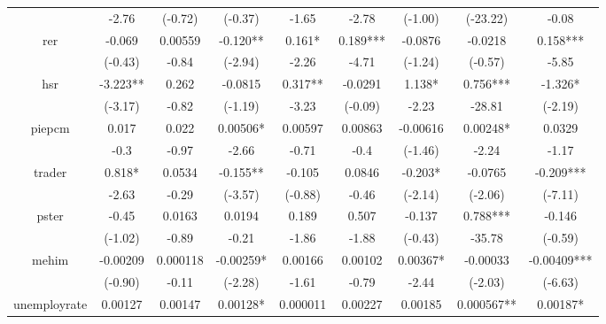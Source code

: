\begin{table}
{\begin{tabular}{ccccccccc}
                                        & -2.76     & (-0.72)     & (-0.37)    & -1.65       & -2.78      & (-1.00)        & (-23.22)   & -0.08       \\
            rer                         & -0.069    & 0.00559     & -0.120**   & 0.161*      & 0.189***   & -0.0876        & -0.0218    & 0.158***    \\
                                        & (-0.43)   & -0.84       & (-2.94)    & -2.26       & -4.71      & (-1.24)        & (-0.57)    & -5.85       \\
            hsr                         & -3.223**  & 0.262       & -0.0815    & 0.317**     & -0.0291    & 1.138*         & 0.756***   & -1.326*     \\
                                        & (-3.17)   & -0.82       & (-1.19)    & -3.23       & (-0.09)    & -2.23          & -28.81     & (-2.19)     \\
            piepcm                      & 0.017     & 0.022       & 0.00506*   & 0.00597     & 0.00863    & -0.00616       & 0.00248*   & 0.0329      \\
                                        & -0.3      & -0.97       & -2.66      & -0.71       & -0.4       & (-1.46)        & -2.24      & -1.17       \\
            trader                      & 0.818*    & 0.0534      & -0.155**   & -0.105      & 0.0846     & -0.203*        & -0.0765    & -0.209***   \\
                                        & -2.63     & -0.29       & (-3.57)    & (-0.88)     & -0.46      & (-2.14)        & (-2.06)    & (-7.11)     \\
            pster                       & -0.45     & 0.0163      & 0.0194     & 0.189       & 0.507      & -0.137         & 0.788***   & -0.146      \\
                                        & (-1.02)   & -0.89       & -0.21      & -1.86       & -1.88      & (-0.43)        & -35.78     & (-0.59)     \\
            mehim                       & -0.00209  & 0.000118    & -0.00259*  & 0.00166     & 0.00102    & 0.00367*       & -0.00033   & -0.00409*** \\
                                        & (-0.90)   & -0.11       & (-2.28)    & -1.61       & -0.79      & -2.44          & (-2.03)    & (-6.63)     \\
            unemployrate                & 0.00127   & 0.00147     & 0.00128*   & 0.000011    & 0.00227    & 0.00185        & 0.000567** & 0.00187*    \\

\end{tabular}}
\end{table}
